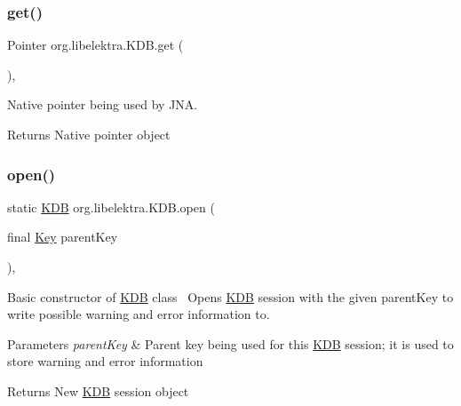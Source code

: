 \subsubsection{\texorpdfstring{get()}{get()}\hspace{0.1cm}{\footnotesize\ttfamily [2/2]}}
{\footnotesize\ttfamily Pointer org.\+libelektra.\+K\+D\+B.\+get (\begin{DoxyParamCaption}{ }\end{DoxyParamCaption})\hspace{0.3cm}{\ttfamily [inline]}, {\ttfamily [protected]}}



Native pointer being used by J\+NA. 

\begin{DoxyReturn}{Returns}
Native pointer object 
\end{DoxyReturn}
\mbox{\label{classorg_1_1libelektra_1_1KDB_ae7e6c1cea2b930a077aec11c3cbdef4b}} 
\subsubsection{\texorpdfstring{open()}{open()}}
{\footnotesize\ttfamily static \mbox{\hyperlink{classorg_1_1libelektra_1_1KDB}{K\+DB}} org.\+libelektra.\+K\+D\+B.\+open (\begin{DoxyParamCaption}\item[{final \mbox{\hyperlink{classorg_1_1libelektra_1_1Key}{Key}}}]{parent\+Key }\end{DoxyParamCaption})\hspace{0.3cm}{\ttfamily [inline]}, {\ttfamily [static]}}



Basic constructor of \mbox{\hyperlink{classorg_1_1libelektra_1_1KDB}{K\+DB}} class~\newline
 Opens \mbox{\hyperlink{classorg_1_1libelektra_1_1KDB}{K\+DB}} session with the given parent\+Key to write possible warning and error information to. 


\begin{DoxyParams}{Parameters}
{\em parent\+Key} & Parent key being used for this \mbox{\hyperlink{classorg_1_1libelektra_1_1KDB}{K\+DB}} session; it is used to store warning and error information \\
\hline
\end{DoxyParams}
\begin{DoxyReturn}{Returns}
New \mbox{\hyperlink{classorg_1_1libelektra_1_1KDB}{K\+DB}} session object 
\end{DoxyReturn}
\mbox{\label{classorg_1_1libelektra_1_1KDB_a4e7f86ca77f654bb11a38cdf6db6383f}} 
